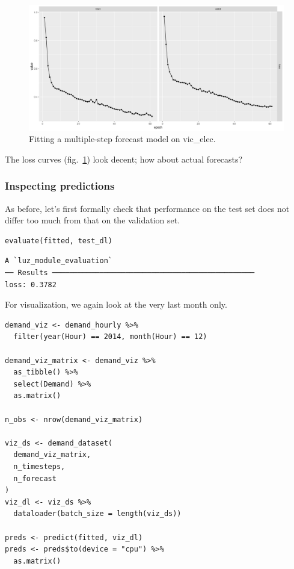 \documentclass[
  letterpaper,
]{krantz}
\begin{document}
\begin{figure}[H]

{\centering \includegraphics{images/timeseries-vic-elec-fit-mlp.png}

}

\caption{\label{fig-timeseries-vic-elec-fit-mlp}Fitting a multiple-step
forecast model on vic\_elec.}

\end{figure}

The loss curves (fig.~\ref{fig-timeseries-vic-elec-fit-mlp}) look
decent; how about actual forecasts?

\hypertarget{inspecting-predictions-1}{%
\subsubsection{Inspecting predictions}\label{inspecting-predictions-1}}

As before, let's first formally check that performance on the test set
does not differ too much from that on the validation set.

\begin{verbatim}
evaluate(fitted, test_dl)
\end{verbatim}

\begin{verbatim}
A `luz_module_evaluation`
── Results ───────────────────────────────────────────────
loss: 0.3782
\end{verbatim}

For visualization, we again look at the very last month only.

\begin{verbatim}
demand_viz <- demand_hourly %>%
  filter(year(Hour) == 2014, month(Hour) == 12)

demand_viz_matrix <- demand_viz %>%
  as_tibble() %>%
  select(Demand) %>%
  as.matrix()

n_obs <- nrow(demand_viz_matrix)

viz_ds <- demand_dataset(
  demand_viz_matrix,
  n_timesteps,
  n_forecast
)
viz_dl <- viz_ds %>%
  dataloader(batch_size = length(viz_ds))

preds <- predict(fitted, viz_dl)
preds <- preds$to(device = "cpu") %>%
  as.matrix()
\end{verbatim}
\end{document}

